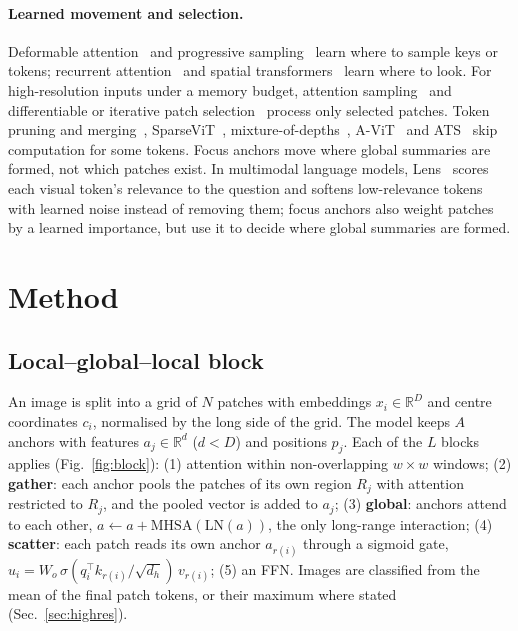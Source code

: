 \documentclass[runningheads]{llncs}
\begin{document}
\paragraph{Learned movement and selection.}
Deformable attention~\cite{xia2022dat} and progressive sampling~\cite{yue2021psvit} learn where
to sample keys or tokens; recurrent attention~\cite{mnih2014ram} and spatial
transformers~\cite{jaderberg2015stn} learn where to look. For high-resolution inputs under a
memory budget, attention sampling~\cite{katharopoulos2019attsampling} and differentiable or
iterative patch selection~\cite{cordonnier2021dps,bergner2023ips} process only selected patches.
Token pruning and merging~\cite{rao2021dynamicvit,bolya2023tome}, SparseViT~\cite{chen2023sparsevit},
mixture-of-depths~\cite{raposo2024mod}, A-ViT~\cite{yin2022avit} and ATS~\cite{fayyaz2022ats}
skip computation for some tokens. Focus anchors move where global summaries are formed, not
which patches exist. In multimodal language models, Lens~\cite{jiang2026lens} scores each visual
token's relevance to the question and softens low-relevance tokens with learned noise instead of
removing them; focus anchors also weight patches by a learned importance, but use it to decide
where global summaries are formed.

\section{Method}
\label{sec:method}

\subsection{Local--global--local block}

An image is split into a grid of $N$ patches with embeddings $x_i\in\mathbb{R}^{D}$ and centre
coordinates $c_i$, normalised by the long side of the grid. The model keeps $A$ anchors with
features $a_j\in\mathbb{R}^{d}$ ($d<D$) and positions $p_j$. Each of the $L$ blocks applies
(Fig.~\ref{fig:block}): (1) attention within non-overlapping $w\times w$ windows; (2)
\textbf{gather}: each anchor pools the patches of its own region $R_j$ with attention restricted
to $R_j$, and the pooled vector is added to $a_j$; (3) \textbf{global}: anchors attend to each
other, $a\leftarrow a+\mathrm{MHSA}(\mathrm{LN}(a))$, the only long-range interaction; (4)
\textbf{scatter}: each patch reads its own anchor $a_{r(i)}$ through a sigmoid gate,
$u_i=W_o\,\sigma(q_i^{\top}k_{r(i)}/\sqrt{d_h})\,v_{r(i)}$; (5) an FFN. Images are classified from
the mean of the final patch tokens, or their maximum where stated (Sec.~\ref{sec:highres}).
\end{document}
